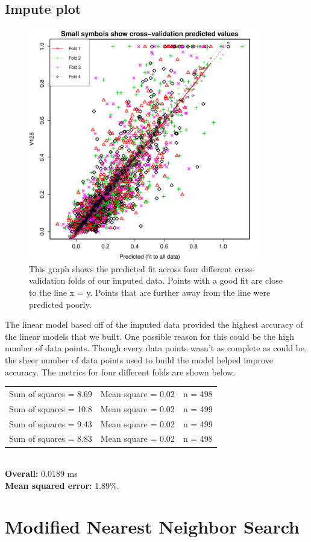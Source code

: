 \documentclass{article}
\begin{document}
\subsection{Impute plot}
\begin{figure}[H]
\centering
\includegraphics[width=4in]{impute.pdf}
\caption{This graph shows the predicted fit across four different
cross-validation folds of our imputed data. Points with a good fit are close to
the line x = y. Points that are further away from the line were predicted
poorly.}\label{fig_container} 
\end{figure}

The linear model based off of the imputed data provided the highest accuracy of
the linear models that we built. One possible reason for this could be the high
number of data points. Though every data points wasn't as complete as could be,
the sheer number of data points used to build the model helped improve accuracy.
The metrics for four different folds are shown below.\\

\noindent
\begin{tabular}{l c r}
  Sum of squares = 8.69 & Mean square = 0.02 & n = 498\\ 
  Sum of squares = 10.8 & Mean square = 0.02 & n = 499\\ 
  Sum of squares = 9.43 & Mean square = 0.02 & n = 499\\ 
  Sum of squares = 8.83 & Mean square = 0.02 & n = 498\\ 
\end{tabular}\\

\noindent
\textbf{Overall:} 0.0189 ms \\
\textbf{Mean squared error:} 1.89\%.

\section{Modified Nearest Neighbor Search}
\end{document}
